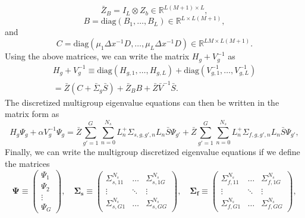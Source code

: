 \begin{equation}
	\bar{Z}_{B} = I_{L} \otimes Z_{b} \in \mathbb{R}^{L(M+1) \times L},
\end{equation}
\begin{equation}
	B = \text{diag}(B_{1}, \dots, B_{L}) \in \mathbb{R}^{L \times L(M+1)},
\end{equation}
and
\begin{equation}
	C = \text{diag}(\mu_{1}\Delta x^{-1}D, \dots, \mu_{L} \Delta x^{-1}D) \in \mathbb{R}^{LM \times L(M+1)}.
\end{equation}
Using the above matrices, we can write the matrix $H_{g} + V^{-1}_{g}$ as
\begin{multline}
H_{g} + V^{-1}_{g} \equiv \text{diag}(H_{g,1}, \dots, H_{g,L}) + \text{diag}(V^{-1}_{g,1}, \dots, V^{-1}_{g,L}) \\ = \bar{Z}(C + \bar{\Sigma}_{g}\bar{S}) + \bar{Z}_{B}B + \bar{Z}\bar{V}^{-1}\bar{S}.
\end{multline}
The discretized multigroup eigenvalue equations can then be written in the matrix form as
\begin{equation}
	H_{g} \Psi_{g} + \alpha V^{-1}_{g}\Psi_{g} = \bar{Z} \sum_{g'=1}^{G} \sum_{n=0}^{N_{s}} L_{n}^{+}\Sigma_{s,g,g',n}L_{n}\bar{S}\Psi_{g'}  +  \bar{Z} \sum_{g'=1}^{G} \sum_{n=0}^{N_{s}} L_{n}^{+}\Sigma_{f,g,g',n}L_{n}\bar{S}\Psi_{g'}, 
	\label{eq:AlphaMGg}
\end{equation}
Finally, we can write the multigroup discretized eigenvalue equations if we define the matrices
\begin{equation}
	\mathbf{\Psi} \equiv \begin{pmatrix}
					\Psi_{1} \\
					\Psi_{2} \\
					\vdots \\
					\Psi_{G}
				       \end{pmatrix}, \quad
	\mathbf{\Sigma_{s}} \equiv \begin{pmatrix}
					\Sigma_{s, 11}^{N_{s}} & \dots & \Sigma_{s,1G}^{N_{s}} \\
					\vdots & \ddots & \vdots \\
					\Sigma_{s, G1}^{N_{s}} & \dots & \Sigma_{s,GG}^{N_{s}}
					\end{pmatrix}, \quad 
	\mathbf{\Sigma_{f}} \equiv \begin{pmatrix}
					\Sigma_{f, 11}^{N_{s}} & \dots & \Sigma_{f,1G}^{N_{s}} \\
					\vdots & \ddots & \vdots \\
					\Sigma_{f, G1}^{N_{s}} & \dots & \Sigma_{f,GG}^{N_{s}}
					\end{pmatrix},
\end{equation}
